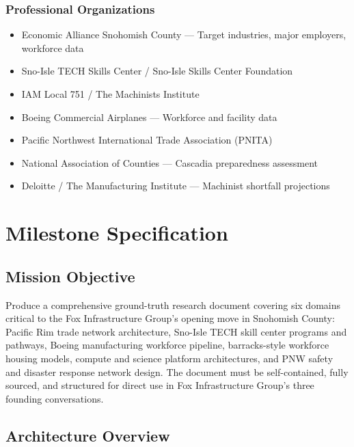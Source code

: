 \documentclass[11pt,letterpaper]{article}
\newcommand{\stageheader}[2]{%
  \noindent\colorbox{#2}{\makebox[\textwidth][l]{%
    \textcolor{white}{\bfseries\sffamily\hspace{6pt}#1\hspace{6pt}}}}%
  \vspace{0.5em}\par%
}
\begin{document}
\subsubsection{Professional Organizations}
\begin{itemize}[leftmargin=2em]
\item Economic Alliance Snohomish County --- Target industries, major employers, workforce data
\item Sno-Isle TECH Skills Center / Sno-Isle Skills Center Foundation
\item IAM Local 751 / The Machinists Institute
\item Boeing Commercial Airplanes --- Workforce and facility data
\item Pacific Northwest International Trade Association (PNITA)
\item National Association of Counties --- Cascadia preparedness assessment
\item Deloitte / The Manufacturing Institute --- Machinist shortfall projections
\end{itemize}

\newpage

\stageheader{STAGE 3 --- MISSION PACKAGE}{tertiary}

\section{Milestone Specification}

\subsection{Mission Objective}

Produce a comprehensive ground-truth research document covering six domains critical to the Fox Infrastructure Group's opening move in Snohomish County: Pacific Rim trade network architecture, Sno-Isle TECH skill center programs and pathways, Boeing manufacturing workforce pipeline, barracks-style workforce housing models, compute and science platform architectures, and PNW safety and disaster response network design. The document must be self-contained, fully sourced, and structured for direct use in Fox Infrastructure Group's three founding conversations.

\subsection{Architecture Overview}
\end{document}
